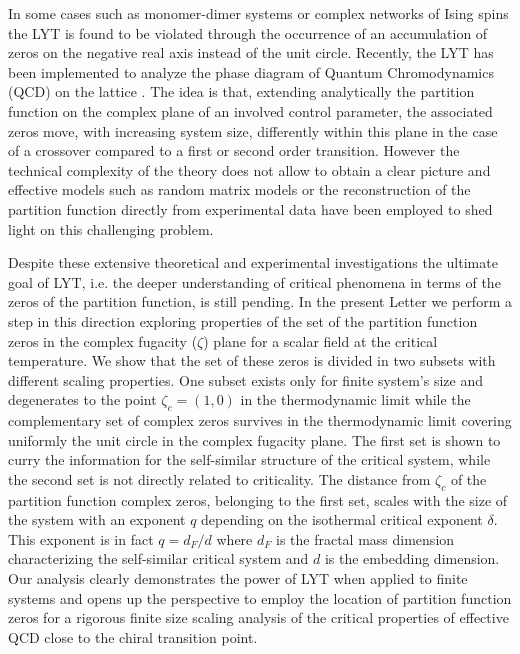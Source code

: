 \documentclass[aps,pre,showpacs,amsmath,amssymb,superscriptaddress,twocolumn]{revtex4-1}
\begin{document}
In some cases such as monomer-dimer systems \cite{Heilmann1972} or complex networks of Ising spins \cite{Lebowitz2012,Krasnytska2015} the LYT is found to be violated through the occurrence of an accumulation of zeros on the negative real axis \cite{Lebowitz2016} instead of the unit circle.  Recently, the LYT has been implemented to analyze the phase diagram of Quantum Chromodynamics (QCD) on the lattice \cite{Barbour1992,Fodor2002,Fodor2004,Ejiri2006}. The idea is that, extending analytically the partition function on the complex plane of an involved control parameter, the associated zeros move, with increasing system size, differently within this plane in the case of a crossover compared to a first or second order transition. However the technical complexity of the theory does not allow to obtain a clear picture and effective models such as random matrix models \cite{Stephanov2006,Morita2015} or the reconstruction of the partition function directly from experimental data \cite{Nakamura2016} have been employed to shed light on this challenging problem.

Despite these extensive theoretical and experimental investigations the ultimate goal of LYT, i.e. the deeper understanding of critical phenomena in terms of the zeros of the partition function, is still pending. In the present Letter we perform a step in this direction exploring properties of the set of the partition function zeros in the complex fugacity ($\zeta$) plane for a scalar field at the critical temperature. We show that the set of these zeros is divided in two subsets with different scaling properties. One subset exists only for finite system's size and  degenerates to the point $\zeta_c=(1,0)$ in the thermodynamic limit while the complementary set of complex zeros survives in the thermodynamic limit covering uniformly the unit circle in the complex fugacity plane. The first set is shown to curry the information for the self-similar structure of the critical system, while the second set is not directly related to criticality. The distance from $\zeta_c$ of the partition function complex zeros, belonging to the first set, scales with the size of the system with an exponent $q$ depending on the isothermal critical exponent $\delta$. This exponent is in fact $q=d_F/d$ where $d_F$ is the fractal mass dimension characterizing the self-similar critical system and $d$ is the embedding dimension. 
Our analysis clearly demonstrates the power of LYT when applied to finite systems and opens up the perspective to employ the location of partition function zeros for a rigorous finite size scaling analysis of the critical properties of effective QCD close to the chiral transition point.  
\end{document}
